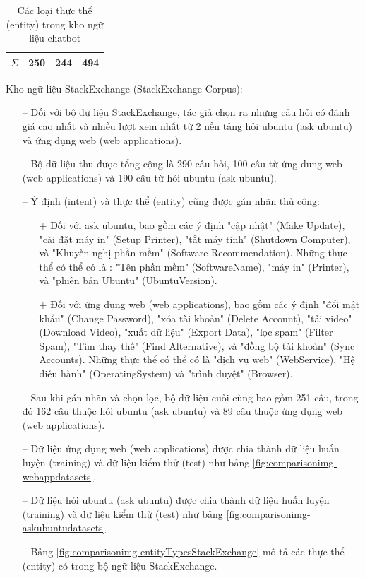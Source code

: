 \begin{table}[]
\begin{center}
\begin{tabular}{|l|l|l|l|}
$\Sigma$                                                          & 250                                                                      & 244                                                                & 494                   \\ \hline
\end{tabular}
\caption{Các loại thực thể (entity) trong kho ngữ liệu chatbot}
\label{fig:comparisonimg-1}
\end{center}
\end{table}

Kho ngữ liệu StackExchange (StackExchange Corpus):

\begin{itemize}
    \item[--] Đối với bộ dữ liệu StackExchange, tác giả chọn ra những câu hỏi có đánh giá cao nhất và nhiều lượt xem nhất từ 2 nền tảng hỏi ubuntu (ask ubuntu) và ứng dụng web (web applications).
        \item[--]Bộ dữ liệu thu được tổng cộng là 290 câu hỏi, 100 câu từ ứng dung web (web applications) và 190 câu từ hỏi ubuntu (ask ubuntu).
        \item[--]Ý định (intent) và thực thể (entity) cũng được gán nhãn thủ công:
        \begin{itemize}
            \item[+]Đối với ask ubuntu, bao gồm các ý định   "cập nhật" (Make Update), "cài đặt máy in" (Setup Printer), "tắt máy tính" (Shutdown Computer), và  "Khuyến nghị phần mềm" (Software Recommendation). Những thực thể có thể có là : "Tên phần mềm" (SoftwareName), "máy in" (Printer), và "phiên bản Ubuntu" (UbuntuVersion).
            \item[+] Đối với ứng dụng web (web applications), bao gồm các ý định "đổi mật khẩu" (Change Password), "xóa tài khoản" (Delete Account), "tải video" (Download Video), "xuất dữ liệu" (Export Data), "lọc spam"  (Filter Spam), "Tìm thay thế" (Find Alternative), và "đồng bộ tài khoản" (Sync Accounts). Những thực thể có thể có là "dịch vụ web" (WebService), "Hệ điều hành" (OperatingSystem) và "trình duyệt" (Browser).
        \end{itemize}
    \item[--] Sau khi gán nhãn và chọn lọc, bộ dữ liệu cuối cùng bao gồm 251 câu, trong đó 162 câu thuộc hỏi ubuntu (ask ubuntu) và 89 câu thuộc ứng dụng web (web applications).
    \item[--] Dữ liệu ứng dụng web (web applications) được chia thành dữ liệu huấn luyện (training) và dữ liệu kiểm thử (test) như bảng  \ref{fig:comparisonimg-webappdatasets}.
     \item[--] Dữ liệu hỏi ubuntu (ask ubuntu) được chia thành dữ liệu huấn luyện (training) và dữ liệu kiểm thử (test) như bảng \ref{fig:comparisonimg-askubuntudatasets}.
      \item[--] Bảng \ref{fig:comparisonimg-entityTypesStackExchange} mô tả các thực thể (entity) có trong bộ ngữ liệu StackExchange.
\end{itemize}


